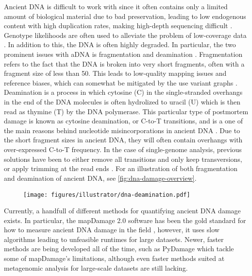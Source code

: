 Ancient DNA is difficult to work with since it often contains only a limited amount of biological material due to bad preservation, leading to low endogenous content with high duplication rates, making high-depth sequencing difficult \autocite{renaudAuthenticationAssessmentContamination2019}. Genotype likelihoods are often used to alleviate the problem of low-coverage data \autocite{nielsenGenotypeSNPCalling2011}.
In addition to this, the DNA is often highly degraded. In particular, the two prominent issues with aDNA is fragmentation and deamination \autocite{dabneyAncientDNADamage2013,peyregnePresentDayDNAContamination2020,}. Fragmentation refers to the fact that the DNA is broken into very short fragments, often with a fragment size of less than \SI{50}{\basepairs}. This leads to low-quality mapping issues and reference biases, which can somewhat be mitigated by the use variant graphs \autocite{martinianoRemovingReferenceBias2020}.
Deamination is a process in which cytosine (C) in the single-stranded overhangs in the end of the DNA molecules is often hydrolized to uracil (U) which is then read as thymine (T) by the DNA polymerase. This particular type of postmortem damage is known as cytosine deamination, or C-to-T transitions, and is a one of the main reasons behind nucleotide misincorporations in ancient DNA \autocite{briggsPatternsDamageGenomic2007}. Due to the short fragment sizes in ancient DNA, they will often contain overhangs with over-expressed C-to-T frequency. In the case of single-genome analysis, previous solutions have been to either remove all transitions and only keep transversions, or apply trimming at the read ends \autocite{schubertImprovingAncientDNA2012}.
For an illustration of both fragmentation and deamination of ancient DNA, see  \autoref{fig:dna-damage-overview}.

\begin{figure}[htbp]
    \centering
    \texttt{[image: figures/illustrator/dna-deamination.pdf]}
\end{figure}

Currently, a handfull of different methods for quantifying ancient DNA damage exists. In particular, the mapDamage 2.0 software has been the gold standard for how to measure ancient DNA damage in the field \autocite{jonssonMapDamage2FastApproximate2013}, however, it uses slow algorithms leading to unfeasible runtimes for large datasets. Newer, faster methods are being developed all of the time, such as PyDamage \autocite{borryPyDamageAutomatedAncient2021} which tackle some of mapDamage's limitations, although even faster methods suited at metagenomic analysis for large-scale datasets are still lacking.

